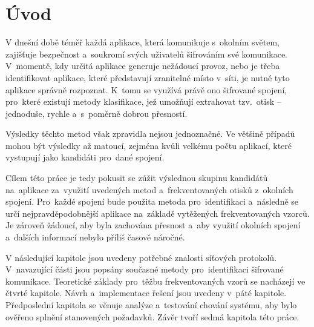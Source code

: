 \chapter{Úvod}
V dnešní době téměř každá aplikace, která komunikuje s~okolním světem, zajišťuje bezpečnost a~soukromí svých uživatelů šifrováním své komunikace. V~momentě, kdy určitá aplikace generuje nežádoucí provoz, nebo je třeba identifikovat aplikace, které představují zranitelné místo v~síti, je nutné tyto aplikace správně rozpoznat. K~tomu se využívá právě ono šifrované spojení, pro~které existují metody klasifikace, jež umožňují extrahovat tzv.~otisk – jednoduše, rychle a~s~poměrně dobrou přesností.

Výsledky těchto metod však zpravidla nejsou jednoznačné. Ve většině případů mohou být výsledky až matoucí, zejména kvůli velkému počtu aplikací, které vystupují jako kandidáti pro~dané spojení.

Cílem této práce je tedy pokusit se zúžit výslednou skupinu kandidátů na~aplikace za~využití uvedených metod a~frekventovaných otisků z~okolních spojení. Pro~každé spojení bude použita metoda pro~identifikaci a~následně se určí nejpravděpodobnější aplikace na~základě vytěžených frekventovaných vzorců. Je zároveň žádoucí, aby byla zachována přesnost a~aby využití okolních spojení a~dalších informací nebylo příliš časově náročné.

V následující kapitole jsou uvedeny potřebné znalosti síťových protokolů. V~navazující části jsou popsány současné metody pro~identifikaci šifrované komunikace. Teoretické základy pro~těžbu frekventovaných vzorů se nacházejí ve čtvrté kapitole. Návrh a~implementace řešení jsou uvedeny v~páté kapitole. Předposlední kapitola se věnuje analýze a~testování chování systému, aby bylo ověřeno splnění stanovených požadavků. Závěr tvoří sedmá kapitola této práce.